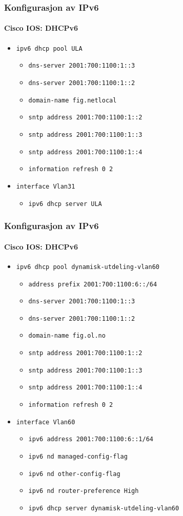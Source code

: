 \begin{frame}
  \frametitle{Konfigurasjon av IPv6}
  \framesubtitle{Cisco IOS: DHCPv6}
  \begin{itemize}
  \item \texttt{ipv6 dhcp pool ULA}
    \begin{itemize}
    \item \texttt{dns-server 2001:700:1100:1::3}
    \item \texttt{dns-server 2001:700:1100:1::2}
    \item \texttt{domain-name fig.netlocal}
    \item \texttt{sntp address 2001:700:1100:1::2}
    \item \texttt{sntp address 2001:700:1100:1::3}
    \item \texttt{sntp address 2001:700:1100:1::4}
    \item \texttt{information refresh 0 2}
    \end{itemize}
  \item \texttt{interface Vlan31}
    \begin{itemize}
    \item \texttt{ipv6 dhcp server ULA}
    \end{itemize}
  \end{itemize}
\end{frame}

\begin{frame}
  \frametitle{Konfigurasjon av IPv6}
  \framesubtitle{Cisco IOS: DHCPv6}
  \begin{itemize}
  \item \texttt{ipv6 dhcp pool dynamisk-utdeling-vlan60}
    \begin{itemize}
    \item \texttt{address prefix 2001:700:1100:6::/64}
    \item \texttt{dns-server 2001:700:1100:1::3}
    \item \texttt{dns-server 2001:700:1100:1::2}
    \item \texttt{domain-name fig.ol.no}
    \item \texttt{sntp address 2001:700:1100:1::2}
    \item \texttt{sntp address 2001:700:1100:1::3}
    \item \texttt{sntp address 2001:700:1100:1::4}
    \item \texttt{information refresh 0 2}
    \end{itemize}
  \item \texttt{interface Vlan60}
    \begin{itemize}
    \item \texttt{ipv6 address 2001:700:1100:6::1/64}
    \item \texttt{ipv6 nd managed-config-flag}
    \item \texttt{ipv6 nd other-config-flag}
    \item \texttt{ipv6 nd router-preference High}
    \item \texttt{ipv6 dhcp server dynamisk-utdeling-vlan60}
    \end{itemize}
  \end{itemize}
\end{frame}

